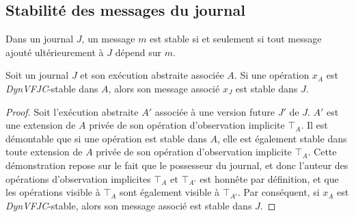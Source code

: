 %




\subsection{Stabilité des messages du journal}\label{subsec:msg-stable}

\begin{definition}
Dans un journal $J$, un message $m$ est stable si et seulement si tout message ajouté ultérieurement à $J$ dépend sur $m$.
\end{definition}

\begin{theorem}\label{th:op-msg-stable}
Soit un journal $J$ et son exécution abstraite associée $A$.
Si une opération $x_A$ est \emph{DynVFJC}-stable dans $A$, alors son message associé $x_J$ est stable dans $J$.
\end{theorem}

\begin{proof}
Soit l'exécution abstraite $A'$ associée à une version future $J'$ de $J$.
$A'$ est une extension de $A$ privée de son opération d'observation implicite $\top_A$.
Il est démontable que si une opération est stable dans $A$, elle est également stable dans toute extension de $A$ privée de son opération d'observation implicite $\top_A$.
Cette démonstration repose sur le fait que le possesseur du journal, et donc l'auteur des opérations d'observation implicites $\top_A$ et $\top_{A'}$ est honnête par définition, et que les opérations visible à $\top_A$ sont également visible à $\top_{A'}$.
Par conséquent, si $x_A$ est \emph{DynVFJC}-stable, alors son message associé est stable dans $J$.
\end{proof}


